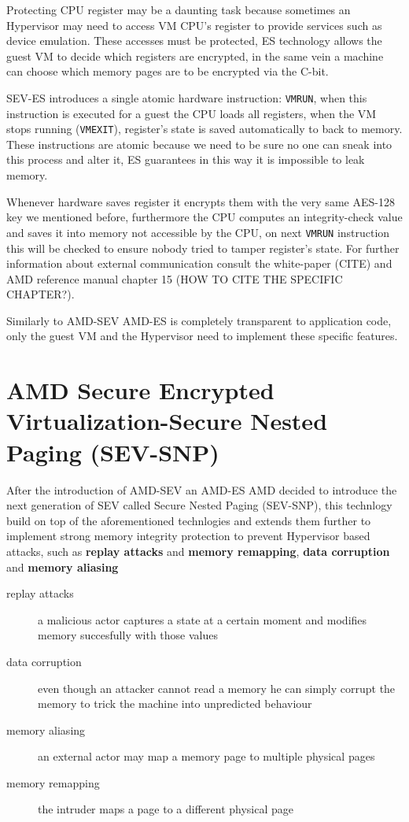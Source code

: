 \documentclass[twocolumn]{article}
\begin{document}
Protecting CPU register may be a daunting task because sometimes an Hypervisor may need to access VM CPU's register to provide services such as device emulation. These accesses must be protected, ES technology allows the guest VM to decide which registers are encrypted, in the same vein a machine can choose which memory pages are to be encrypted via the C-bit.

SEV-ES introduces a single atomic hardware instruction: \texttt{VMRUN}, when this instruction is executed for a guest the CPU loads all registers, when the VM stops running (\texttt{VMEXIT}), register's state is saved automatically to  back to memory. These instructions are atomic because we need to be sure no one can sneak into this process and alter it, ES guarantees in this way it is impossible to leak memory.

Whenever hardware saves register it encrypts them with the very same AES-128 key we mentioned before, furthermore the CPU computes an integrity-check value and saves it into memory not accessible by the CPU, on next \texttt{VMRUN} instruction this will be checked to ensure nobody tried to tamper register's state. For further information about external communication consult the white-paper (CITE) and AMD reference manual chapter 15 (HOW TO CITE THE SPECIFIC CHAPTER?).

Similarly to AMD-SEV AMD-ES is completely transparent to application code, only the guest VM and the Hypervisor need to implement these specific features.

\section{AMD Secure Encrypted Virtualization-Secure Nested Paging (SEV-SNP)}

After the introduction of AMD-SEV an AMD-ES AMD decided to introduce the next generation of SEV called Secure Nested Paging (SEV-SNP), this technlogy build on top of the aforementioned technlogies and extends them further to implement strong memory integrity protection to prevent Hypervisor based attacks, such as \textbf{replay attacks} and \textbf{memory remapping}, \textbf{data corruption} and \textbf{memory aliasing}

\begin{description}
    \item[replay attacks] a malicious actor captures a state at a certain moment and modifies memory succesfully with those values
    \item[data corruption]  even though an attacker cannot read a memory he can simply corrupt the memory to trick the machine into unpredicted behaviour
    \item[memory aliasing]  an external actor may map a memory page to multiple physical pages
    \item[memory remapping]  the intruder maps a page to a different physical page
\end{description}
\end{document}
